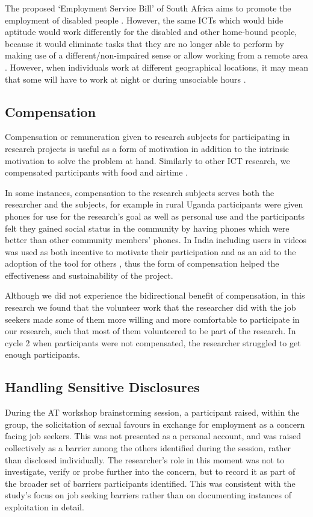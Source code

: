 The proposed ‘Employment Service Bill’ of South Africa aims to promote the employment of disabled people \cite{gitau2012}. However, the same ICTs which would hide aptitude would work differently for the disabled and other home-bound people, because it would eliminate tasks that they are no longer able to perform by making use of a different/non-impaired sense \cite{stefano2016} or allow working from a remote area \cite{stefano2016}. However, when individuals work at different geographical locations, it may mean that some will have to work at night or during unsociable hours \cite{stefano2016}.  
\subsection{Compensation}

Compensation or remuneration given to research subjects for participating in research projects is useful as a form of motivation \cite{zimmerman2011, ssozi2017} in addition to the intrinsic motivation to solve the problem at hand. Similarly to other ICT research, we compensated participants with food \cite{winschiers2009} and airtime \cite{gupta2012}.


In some instances, compensation to the research subjects serves both the researcher and the subjects, for example in rural Uganda participants were given phones for use for the research’s goal as well as personal use and the participants felt they gained social status in the community by having phones which were better than other community members’ phones. In India including users in videos was used as both incentive to motivate their participation and as an aid to the adoption of the tool for others \cite{gandhi2007}, thus the form of compensation helped the effectiveness and sustainability of the project.  

Although we did not experience the bidirectional benefit of compensation, in this research we found that the volunteer work that the researcher did with the job seekers made some of them more willing and more comfortable to participate in our research, such that most of them volunteered to be part of the research. In cycle 2 when participants were not compensated, the researcher struggled to get enough participants.

\subsection{Handling Sensitive Disclosures} \label{sec:sensitive-disclosures}
During the AT workshop brainstorming session, a participant raised, within the group, the solicitation of sexual favours in exchange for employment as a concern facing job seekers. This was not presented as a personal account, and was raised collectively as a barrier among the others identified during the session, rather than disclosed individually. The researcher's role in this moment was not to investigate, verify or probe further into the concern, but to record it as part of the broader set of barriers participants identified. This was consistent with the study's focus on job seeking barriers rather than on documenting instances of exploitation in detail.

